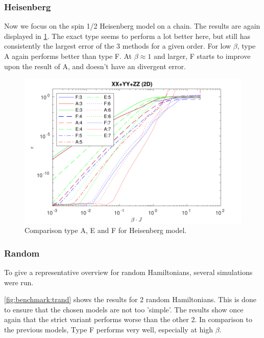 \subsubsection{Heisenberg}

Now we focus on the spin 1/2 Heisenberg model on a chain. The results are again displayed in \cref{fig:benchmark:tHeisenberg}. The exact type seems to perform a lot better here, but still has consistently the largest error of the 3 methods for a given order. For low $\beta$, type A again performs better than type F. At $\beta \approx 1$ and larger, F starts to improve upon the result of A, and doesn't have an divergent error.

\begin{figure}[H]
    \center
    \includegraphics[width=\textwidth]{Figuren/benchmarking/t_heis_XXX.pdf}
    \caption{Comparison type A, E and F for Heisenberg model.}
    \label{fig:benchmark:tHeisenberg}
\end{figure}

\subsubsection{Random}

To give a representative overview for random Hamiltonians, several simulations were run. 

\cref{fig:benchmark:trand} shows the results for 2 random Hamiltonians. This is done to ensure that the chosen models are not too 'simple'. The results show once again that the strict variant performs worse than the other 2. In comparison to the previous models, Type F performs very well, especially at high $\beta$.

